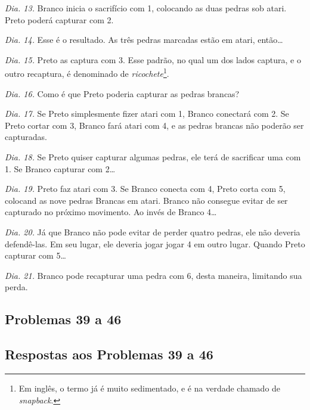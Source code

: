 \emph{Dia. 13.} Branco inicia o sacrifício com 1, colocando as duas pedras sob atari. Preto poderá capturar com 2.

\emph{Dia. 14.} Esse é o resultado. As três pedras marcadas estão em atari, então\ldots

\emph{Dia. 15.} Preto as captura com 3. Esse padrão, no qual um dos lados captura, e o outro recaptura, é denominado de \emph{ricochete}\footnote{Em inglês, o termo já é muito sedimentado, e é na verdade chamado de \emph{snapback}.}.

\emph{Dia. 16.} Como é que Preto poderia capturar as pedras brancas?

\emph{Dia. 17.} Se Preto simplesmente fizer atari com 1, Branco conectará com 2. Se Preto cortar com 3, Branco fará atari com 4, e as pedras brancas não poderão ser capturadas.

\emph{Dia. 18.} Se Preto quiser capturar algumas pedras, ele terá de sacrificar uma com 1. Se Branco capturar com 2\ldots

\emph{Dia. 19.} Preto faz atari com 3. Se Branco conecta com 4, Preto corta com 5, colocand as nove pedras Brancas em atari. Branco não consegue evitar de ser capturado no próximo movimento. Ao invés de Branco 4\ldots

\emph{Dia. 20.} Já que Branco não pode evitar de perder quatro pedras, ele não deveria defendê-las. Em seu lugar, ele deveria jogar jogar 4 em outro lugar. Quando Preto capturar com 5\ldots

\emph{Dia. 21.} Branco pode recapturar uma pedra com 6, desta maneira, limitando sua perda.

\subsection{Problemas 39 a 46}

\subsection{Respostas aos Problemas 39 a 46}

